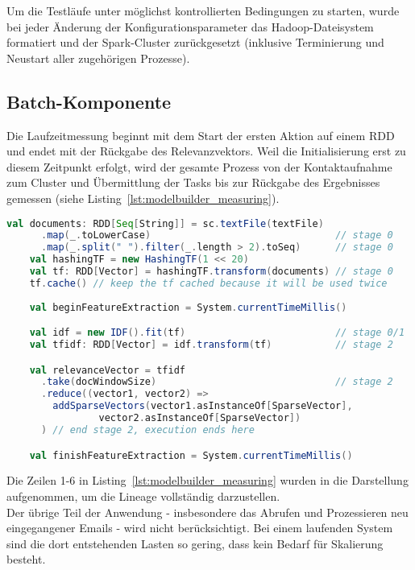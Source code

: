 Um die Testläufe unter möglichst kontrollierten Bedingungen zu starten, wurde bei jeder Änderung der Konfigurationsparameter das Hadoop-Dateisystem formatiert und der Spark-Cluster zurückgesetzt (inklusive Terminierung und Neustart aller zugehörigen Prozesse).

\subsection{Batch-Komponente}

Die Laufzeitmessung beginnt mit dem Start der ersten Aktion auf einem \gls{RDD} und endet mit der Rückgabe des Relevanzvektors.
Weil die Initialisierung erst zu diesem Zeitpunkt erfolgt, wird der gesamte Prozess von der Kontaktaufnahme zum Cluster und Übermittlung der Tasks bis zur Rückgabe des Ergebnisses gemessen (siehe Listing~\ref{lst:modelbuilder_measuring}).\\

\begin{lstlisting}[language=Scala,caption={Laufzeitmessung},label={lst:modelbuilder_measuring}]
    val documents: RDD[Seq[String]] = sc.textFile(textFile)
      .map(_.toLowerCase)                                // stage 0
      .map(_.split(" ").filter(_.length > 2).toSeq)      // stage 0
    val hashingTF = new HashingTF(1 << 20)
    val tf: RDD[Vector] = hashingTF.transform(documents) // stage 0
    tf.cache() // keep the tf cached because it will be used twice
		
    val beginFeatureExtraction = System.currentTimeMillis()

    val idf = new IDF().fit(tf)                          // stage 0/1
    val tfidf: RDD[Vector] = idf.transform(tf)           // stage 2

    val relevanceVector = tfidf
      .take(docWindowSize)                               // stage 2
      .reduce((vector1, vector2) =>
        addSparseVectors(vector1.asInstanceOf[SparseVector], 
				vector2.asInstanceOf[SparseVector])
      ) // end stage 2, execution ends here

    val finishFeatureExtraction = System.currentTimeMillis()
\end{lstlisting}

Die Zeilen 1-6 in Listing~\ref{lst:modelbuilder_measuring} wurden in die Darstellung aufgenommen, um die Lineage vollständig darzustellen.\\

Der übrige Teil der Anwendung - insbesondere das Abrufen und Prozessieren neu eingegangener Emails - wird nicht berücksichtigt. Bei einem laufenden System sind die dort entstehenden Lasten so gering, dass kein Bedarf für Skalierung besteht.


